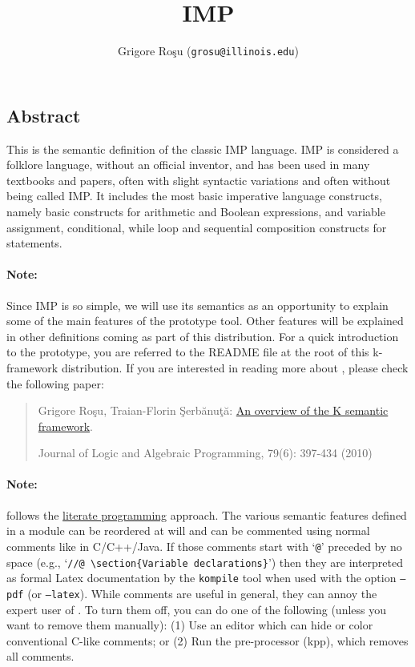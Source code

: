 \setlength{\parindent}{1em}
\title{IMP}
\author{Grigore Ro\c{s}u (\texttt{grosu@illinois.edu})}

\maketitle

\begin{latexComment}
\section{Abstract}
This is the \K semantic definition of the classic IMP language.
IMP is considered a folklore language, without an official inventor,
and has been used in many textbooks and papers, often with slight
syntactic variations and often without being called IMP\@.  It includes
the most basic imperative language constructs, namely basic constructs
for arithmetic and Boolean expressions, and variable assignment,
conditional, while loop and sequential composition constructs for statements.

\paragraph{Note:}{
Since IMP is so simple, we will use its semantics as an opportunity to
explain some of the main features of the \K  prototype tool.  Other
features will be explained in other \K definitions coming as part of
this distribution.  For a quick introduction to the \K prototype, you
are referred to the README file at the root of this k-framework
distribution.  If you are interested in reading more about \K, please
check the following paper:
\begin{quote}
Grigore Ro\c su, Traian-Florin \c Serb\u anu\c t\u a:
\href{http://dx.doi.org/10.1016/j.jlap.2010.03.012}
     {An overview of the K semantic framework}.

Journal of Logic and Algebraic Programming, 79(6): 397-434 (2010)
\end{quote}
}

\paragraph{Note:}{
\K follows the
\href{https://en.wikipedia.org/wiki/Literate_programming}{literate
programming} approach.  The various semantic features defined in a \K
module can be reordered at will and can be commented using normal
comments like in C/C++/Java.  If those comments start with
`\texttt{@}' preceded by no space (e.g.,
`\texttt{//@ {\textbackslash}section\{Variable declarations\}}')
then they are interpreted as formal Latex documentation by the
\texttt{kompile} tool when used with the option \texttt{--pdf}
(or \texttt{--latex}).
While comments are useful in general, they can annoy the expert user
of \K.  To turn them off, you can do one of the following (unless you
want to remove them manually): (1) Use an editor which can hide or
color conventional C-like comments; or (2) Run the \K pre-processor
(kpp), which removes all comments.
}

\end{latexComment}

\vspace*{3ex}
